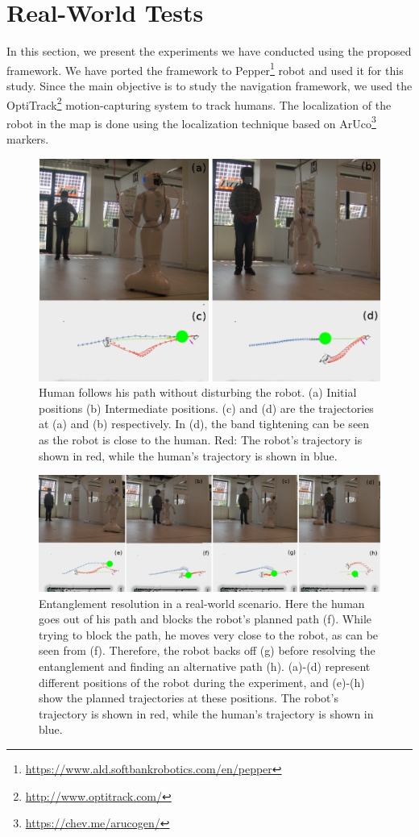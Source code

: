 \section{Real-World Tests}\label{real_chap3}
In this section, we present the experiments we have conducted using the proposed framework. We have ported the framework to Pepper\footnote{\url{https://www.ald.softbankrobotics.com/en/pepper}} robot and used it for this study. Since the main objective is to study the navigation framework, we used the OptiTrack\footnote{\url{http://www.optitrack.com/}} motion-capturing system to track humans. The localization of the robot in the map is done using the localization technique based on ArUco\footnote{\url{https://chev.me/arucogen/}} markers.
\begin{figure}[!h]
\centering
\includegraphics[width=0.9\columnwidth]{images/chapter3/pepper_case_1_new}
\caption{Human follows his path without disturbing the robot. (a) Initial positions (b) Intermediate positions. (c) and (d) are the trajectories at (a) and (b) respectively. In (d), the band tightening can be seen as the robot is close to the human. Red: The robot's trajectory is shown in red, while the human's trajectory is shown in blue.}
\label{case1_pepper}
\end{figure}

\begin{figure}[!h]
\centering
\includegraphics[width=0.9\columnwidth]{images/chapter3/pepper_case_2}
\caption{Entanglement resolution in a real-world scenario. Here the human goes out of his path and blocks the robot's planned path (f). While trying to block the path, he moves very close to the robot, as can be seen from (f). Therefore, the robot backs off (g) before resolving the entanglement and finding an alternative path (h). (a)-(d) represent different positions of the robot during the experiment, and (e)-(h) show the planned trajectories at these positions. The robot's trajectory is shown in red, while the human's trajectory is shown in blue.}
\label{case2_pepper}
\end{figure}

